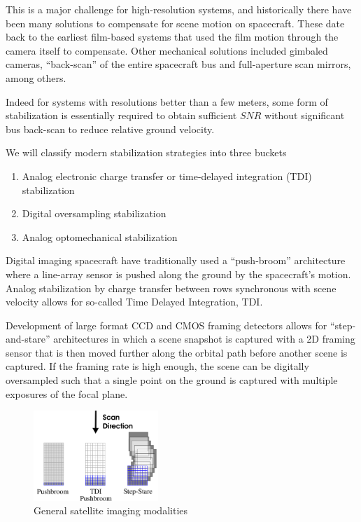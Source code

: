 \documentclass[10pt,journal]{IEEEtran}  %
\begin{document}
This is a major challenge for high-resolution systems, and historically there have been many solutions to compensate for scene motion on spacecraft.  These date back to the earliest film-based systems that used the film motion through the camera itself to compensate.  Other mechanical solutions included gimbaled cameras, ``back-scan'' of the entire spacecraft bus and full-aperture scan mirrors, among others.

Indeed for systems with resolutions better than a few meters, some form of stabilization is essentially required to obtain sufficient $SNR$ without significant bus back-scan to reduce relative ground velocity.

We will classify modern stabilization strategies into three  buckets

\begin{enumerate}
\item Analog electronic charge transfer or time-delayed integration (TDI) stabilization
\item Digital oversampling stabilization
\item Analog optomechanical stabilization
\end{enumerate}

Digital imaging spacecraft have traditionally used a ``push-broom'' architecture where a line-array sensor is pushed along the ground by the spacecraft's motion.  Analog stabilization by charge transfer between rows synchronous with scene velocity allows for so-called Time Delayed Integration, TDI.  

Development of large format CCD and CMOS framing detectors allows for ``step-and-stare'' architectures in which a scene snapshot is captured with a 2D framing sensor that is then moved further along the orbital path before another scene is captured.  If the framing rate is high enough, the scene can be digitally oversampled such that a single point on the ground is captured with multiple exposures of the focal plane.

\begin{figure}[h!t]
\includegraphics[width=0.42\textwidth]{figures/modalities.png}
\caption{General satellite imaging modalities}
\label{fig:modalities}
\end{figure}
\end{document}
